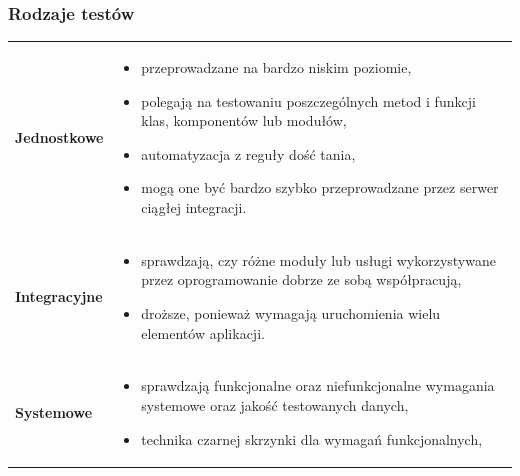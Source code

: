 \documentclass[a4paper]{article}
\begin{document}
    \subsubsection{Rodzaje testów}
    \begin{table}[H]
        \begin{center}
            \begin{tabular}{ p{2cm} p{14cm} }
                \textbf{Jednostkowe}
                &
                \begin{itemize}
                    \item przeprowadzane na bardzo niskim poziomie,
                    \item polegają na testowaniu poszczególnych metod i funkcji
                    klas, komponentów lub modułów,
                    \item automatyzacja z reguły dość tania,
                    \item mogą one być bardzo szybko przeprowadzane przez serwer
                    ciągłej integracji.
                \end{itemize}
                \\

                \cmidrule(r){1-2}

                \textbf{Integracyjne}
                &
                \begin{itemize}
                    \item sprawdzają, czy różne moduły lub usługi wykorzystywane przez oprogramowanie
                    dobrze ze sobą współpracują,
                    \item droższe, ponieważ
                    wymagają uruchomienia wielu elementów aplikacji.
                \end{itemize}
                \\

                \cmidrule(r){1-2}

                \textbf{Systemowe}
                &
                \begin{itemize}
                    \item sprawdzają funkcjonalne oraz niefunkcjonalne wymagania systemowe oraz jakość
                    testowanych danych,
                    \item technika czarnej skrzynki dla wymagań funkcjonalnych,
                \end{itemize}
                \\


\end{tabular}
\end{center}
\end{table}
\end{document}
